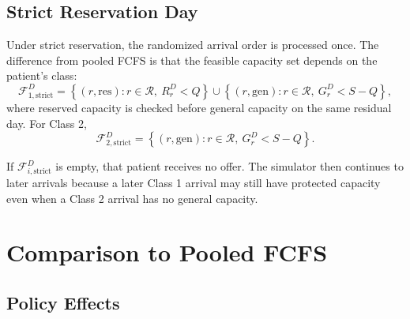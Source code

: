 \documentclass[11pt]{article}
\begin{document}
\subsection{Strict Reservation Day}

Under strict reservation, the randomized arrival order is processed once. The difference from pooled
FCFS is that the feasible capacity set depends on the patient's class:
\[
\mathcal F_{1,\mathrm{strict}}^D
=
\left\{(r,\mathrm{res}):r\in\mathcal R,\ R_r^D<Q\right\}
\cup
\left\{(r,\mathrm{gen}):r\in\mathcal R,\ G_r^D<S-Q\right\},
\]
where reserved capacity is checked before general capacity on the same residual day. For Class 2,
\[
\mathcal F_{2,\mathrm{strict}}^D
=
\left\{(r,\mathrm{gen}):r\in\mathcal R,\ G_r^D<S-Q\right\}.
\]

If \(\mathcal F_{i,\mathrm{strict}}^D\) is empty, that patient receives no offer. The simulator then
continues to later arrivals because a later Class 1 arrival may still have protected capacity even
when a Class 2 arrival has no general capacity.

\section{Comparison to Pooled FCFS}

\subsection{Policy Effects}

\begin{center}
\small
{}
\normalsize
\end{center}
\end{document}
